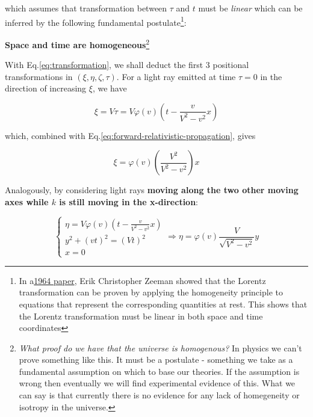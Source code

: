 which assumes that transformation between $\tau$ and $t$ must be \textit{linear} which can be inferred by the
following fundamental postulate\footnote{In a\href{https://download.wpsoftware.net/causality-lorentz-group-zeeman.pdf}{1964 paper}, Erik Christopher Zeeman showed that the Lorentz transformation can be proven by applying the homogeneity principle to equations that represent the corresponding quantities at rest. This shows that the Lorentz transformation must be linear in both space and time coordinates}:

\begin{tcolorbox}[
    enhanced,frame hidden,boxrule=0pt,interior style={top color=green!10!white,
    bottom color=green!10!white,middle color=green!50!yellow},
    fuzzy halo=1pt with green
]
    \begin{center}
        \textbf{Space and time are homogeneous}\footnote{\textit{What proof do we have that the universe is
        homogenous?} In physics we can't prove something like this. It must be a postulate - something we take as a
        fundamental assumption on which to base our theories. If the assumption is wrong then eventually we will find
        experimental evidence of this. What we can say is that currently there is no evidence for any lack of
        homegeneity or isotropy in the universe.}
    \end{center}
\end{tcolorbox}

With Eq.\ref{eq:transformation}, we shall deduct the first 3 positional transformations in $(\xi, \eta, \zeta, \tau)$.
For a light ray emitted at time $\tau = 0$ in the direction of increasing $\xi$, we have

\begin{equation}
    \xi = V\tau = V\varphi(v)\left( t - \frac{v}{V^2 - v^2} x \right)
\end{equation}

which, combined with Eq.\ref{eq:forward-relativistic-propagation}, gives

\begin{equation}\label{eq:x-transformation}
    \xi = \varphi(v)\left( \frac{V^2}{V^2 - v^2} \right) x
\end{equation}

Analogously, by considering light rays \textbf{moving along the two other moving axes while $k$ is still moving in the
x-direction}:

\begin{equation}\label{eq:y-transformation}
    \left\{
    \begin{array}{l}
        \eta = V\varphi(v)\left( t - \frac{v}{V^2 - v^2} x \right) \\
        y^2 + (vt)^2 = (Vt)^2 \\
        x = 0
    \end{array}
    \right.
    \Rightarrow
    \eta = \varphi(v)\frac{V}{\sqrt{V^2 - v^2}}y
\end{equation}

